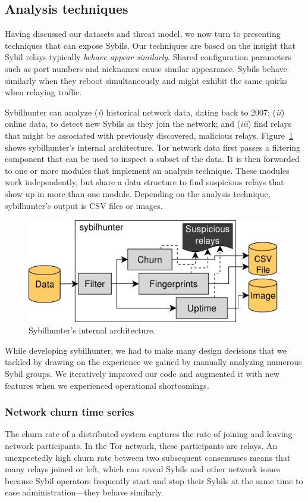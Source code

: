 \subsection{Analysis techniques}
\label{sec:techniques}
Having discussed our datasets and threat model, we now turn to presenting
techniques that can expose Sybils.  Our techniques are based on the insight that
Sybil relays typically \emph{behave appear similarly}.  Shared configuration
parameters such as port numbers and nicknames cause similar appearance.  Sybils
behave similarly when they reboot simultaneously and might exhibit the same
quirks when relaying traffic.

Sybilhunter can analyze (\emph{i}) historical network data, dating back to 2007;
(\emph{ii}) online data, to detect new Sybils as they join the network; and
(\emph{iii}) find relays that might be associated with previously discovered,
malicious relays.  Figure~\ref{fig:shr-internal} shows sybilhunter's internal
architecture.  Tor network data first passes a filtering component that can be
used to inspect a subset of the data.  It is then forwarded to one or more
modules that implement an analysis technique.  These modules work independently,
but share a data structure to find suspicious relays that show up in more than
one module.  Depending on the analysis technique, sybilhunter's output is CSV
files or images.

\begin{figure}[t]
	\centering
	\includegraphics[width=0.9\linewidth]{diagrams/sybilhunter-internal.pdf}
	\caption{Sybilhunter's internal architecture.}
	\label{fig:shr-internal}
\end{figure}

While developing sybilhunter, we had to make many design decisions that we
tackled by drawing on the experience we gained by manually analyzing numerous
Sybil groups.  We iteratively improved our code and augmented it with new
features when we experienced operational shortcomings.

\subsubsection{Network churn time series}
\label{sec:churn-time-series}
The churn rate of a distributed system captures the rate of joining and leaving
network participants.  In the Tor network, these participants are relays.  An
unexpectedly high churn rate between two subsequent consensuses means that many
relays joined or left, which can reveal Sybils and other network issues because
Sybil operators frequently start and stop their Sybils at the same time to ease
administration---they behave similarly.

